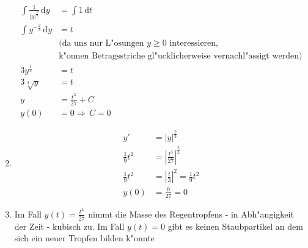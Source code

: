\documentclass[fleqn,12pt]{scrartcl}
\newcommand{\id}{\, \mathrm{d}}
\let\oldsqrt\sqrt
\def\sqrt{\mathpalette\DHLhksqrt}
\def\DHLhksqrt#1#2{%
	\setbox0=\hbox{$#1\oldsqrt{#2\,}$}\dimen0=\ht0
	\advance\dimen0-0.2\ht0
	\setbox2=\hbox{\vrule height\ht0 depth -\dimen0}%
{\box0\lower0.4pt\box2}}
\newcommand{\abs}[1]{
	\left \vert #1 \right \vert
}
\begin{document}
\begin{enumerate}
\begin{align*}
		\int \frac1{\abs{y}^{\frac23}} \id y &= \int 1 \id t\\
		\int {y}^{-\frac23} \id y &= t\\
																						 &\text{(da uns nur L"osungen $y\geq 0$ interessieren,}\\
																&\text{k"onnen Betragsstriche gl"ucklicherweise vernachl"assigt werden)}\\
		3 y^{\frac13} &= t\\
		3{\oldsqrt[3]{y}} &= t\\
		y &= \frac{t^3}{27} + C\\
		y(0) &= 0 \Rightarrow \, C=0
	\end{align*}
\item
	\begin{align*}
		y' &= \abs{y}^{\frac23}\\
	\frac1{9}t^2 &= \abs{\frac{t^3}{27}}^{\frac23}\\
		\frac1{9}t^2 &= \abs{\frac{t}{3}}^2 = \frac19 t^2\\
		y(0) &= \frac0{27} = 0
	\end{align*}
\item
	Im Fall $y(t) = \frac{t^3}{27}$ nimmt die Masse des Regentropfens - in Abh"angigkeit der Zeit - kubisch zu. Im Fall $y(t) = 0$ gibt es keinen Staubpartikel an dem sich ein neuer Tropfen bilden k"onnte


\end{enumerate}
\end{document}
